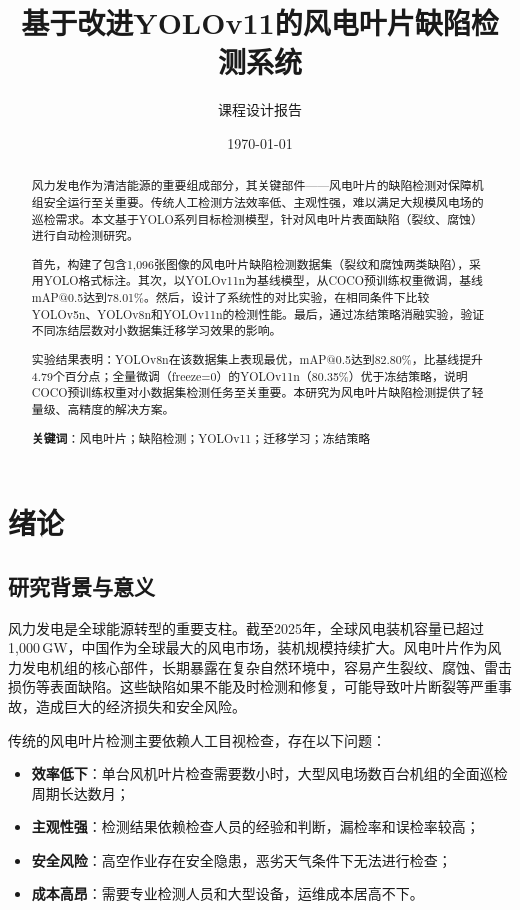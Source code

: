 \documentclass[12pt,a4paper]{article}
\title{\heiti\Large 基于改进YOLOv11的风电叶片缺陷检测系统}
\author{
  课程设计报告
}
\date{\today}
\begin{document}
\maketitle

\begin{abstract}
风力发电作为清洁能源的重要组成部分，其关键部件——风电叶片的缺陷检测对保障机组安全运行至关重要。传统人工检测方法效率低、主观性强，难以满足大规模风电场的巡检需求。本文基于YOLO系列目标检测模型，针对风电叶片表面缺陷（裂纹、腐蚀）进行自动检测研究。

首先，构建了包含1,096张图像的风电叶片缺陷检测数据集（裂纹和腐蚀两类缺陷），采用YOLO格式标注。其次，以YOLOv11n为基线模型，从COCO预训练权重微调，基线mAP@0.5达到78.01\%。然后，设计了系统性的对比实验，在相同条件下比较YOLOv5n、YOLOv8n和YOLOv11n的检测性能。最后，通过冻结策略消融实验，验证不同冻结层数对小数据集迁移学习效果的影响。

实验结果表明：YOLOv8n在该数据集上表现最优，mAP@0.5达到82.80\%，比基线提升4.79个百分点；全量微调（freeze=0）的YOLOv11n（80.35\%）优于冻结策略，说明COCO预训练权重对小数据集检测任务至关重要。本研究为风电叶片缺陷检测提供了轻量级、高精度的解决方案。

\medskip
\noindent\textbf{关键词}：风电叶片；缺陷检测；YOLOv11；迁移学习；冻结策略
\end{abstract}

\newpage
\tableofcontents
\newpage

\section{绪论}

\subsection{研究背景与意义}

风力发电是全球能源转型的重要支柱。截至2025年，全球风电装机容量已超过1,000\,GW，中国作为全球最大的风电市场，装机规模持续扩大。风电叶片作为风力发电机组的核心部件，长期暴露在复杂自然环境中，容易产生裂纹、腐蚀、雷击损伤等表面缺陷。这些缺陷如果不能及时检测和修复，可能导致叶片断裂等严重事故，造成巨大的经济损失和安全风险。

传统的风电叶片检测主要依赖人工目视检查，存在以下问题：
\begin{itemize}[noitemsep]
  \item \textbf{效率低下}：单台风机叶片检查需要数小时，大型风电场数百台机组的全面巡检周期长达数月；
  \item \textbf{主观性强}：检测结果依赖检查人员的经验和判断，漏检率和误检率较高；
  \item \textbf{安全风险}：高空作业存在安全隐患，恶劣天气条件下无法进行检查；
  \item \textbf{成本高昂}：需要专业检测人员和大型设备，运维成本居高不下。
\end{itemize}
\end{document}
